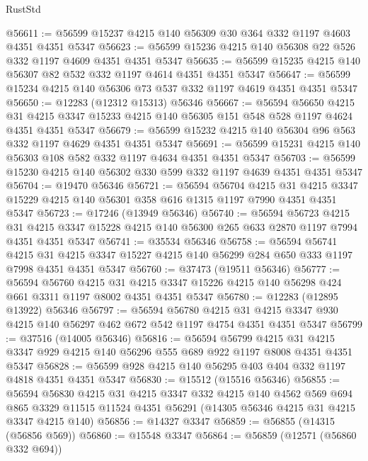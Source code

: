 \begin{lexlean}{RustStd}
\begin{coremodule}
@56611 := @56599 @15237 @4215 @140 @56309 @30 @364 @332 @1197 @4603 @4351 @4351 @5347
@56623 := @56599 @15236 @4215 @140 @56308 @22 @526 @332 @1197 @4609 @4351 @4351 @5347
@56635 := @56599 @15235 @4215 @140 @56307 @82 @532 @332 @1197 @4614 @4351 @4351 @5347
@56647 := @56599 @15234 @4215 @140 @56306 @73 @537 @332 @1197 @4619 @4351 @4351 @5347
@56650 := @12283 (@12312 @15313) @56346
@56667 := @56594
    @56650
    @4215
    @31
    @4215
    @3347
    @15233
    @4215
    @140
    @56305
    @151
    @548
    @528
    @1197
    @4624
    @4351
    @4351
    @5347
@56679 := @56599 @15232 @4215 @140 @56304 @96 @563 @332 @1197 @4629 @4351 @4351 @5347
@56691 := @56599 @15231 @4215 @140 @56303 @108 @582 @332 @1197 @4634 @4351 @4351 @5347
@56703 := @56599 @15230 @4215 @140 @56302 @330 @599 @332 @1197 @4639 @4351 @4351 @5347
@56704 := @19470 @56346
@56721 := @56594
    @56704
    @4215
    @31
    @4215
    @3347
    @15229
    @4215
    @140
    @56301
    @358
    @616
    @1315
    @1197
    @7990
    @4351
    @4351
    @5347
@56723 := @17246 (@13949 @56346)
@56740 := @56594
    @56723
    @4215
    @31
    @4215
    @3347
    @15228
    @4215
    @140
    @56300
    @265
    @633
    @2870
    @1197
    @7994
    @4351
    @4351
    @5347
@56741 := @35534 @56346
@56758 := @56594
    @56741
    @4215
    @31
    @4215
    @3347
    @15227
    @4215
    @140
    @56299
    @284
    @650
    @333
    @1197
    @7998
    @4351
    @4351
    @5347
@56760 := @37473 (@19511 @56346)
@56777 := @56594
    @56760
    @4215
    @31
    @4215
    @3347
    @15226
    @4215
    @140
    @56298
    @424
    @661
    @3311
    @1197
    @8002
    @4351
    @4351
    @5347
@56780 := @12283 (@12895 @13922) @56346
@56797 := @56594
    @56780
    @4215
    @31
    @4215
    @3347
    @930
    @4215
    @140
    @56297
    @462
    @672
    @542
    @1197
    @4754
    @4351
    @4351
    @5347
@56799 := @37516 (@14005 @56346)
@56816 := @56594
    @56799
    @4215
    @31
    @4215
    @3347
    @929
    @4215
    @140
    @56296
    @555
    @689
    @922
    @1197
    @8008
    @4351
    @4351
    @5347
@56828 := @56599 @928 @4215 @140 @56295 @403 @404 @332 @1197 @4818 @4351 @4351 @5347
@56830 := @15512 (@15516 @56346)
@56855 := @56594
    @56830
    @4215
    @31
    @4215
    @3347
    @332
    @4215
    @140
    @4562
    @569
    @694
    @865
    @3329
    @11515
    @11524
    @4351
    @56291
    (@14305 @56346 @4215 @31 @4215 @3347 @4215 @140)
@56856 := @14327 @3347
@56859 := @56855 (@14315 (@56856 @569))
@56860 := @15548 @3347
@56864 := @56859 (@12571 (@56860 @332 @694))

\end{coremodule}
\end{lexlean}
